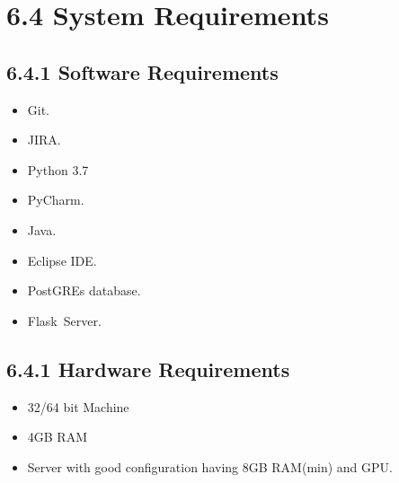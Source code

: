 \documentclass[oneside,a4paper,12pt]{book}
\begin{document}
\section*{6.4 System Requirements}
\subsection*{6.4.1 Software Requirements}
\setlength{\parskip}{0.0pt}
\begin{itemize}
	\item Git.\par

	\item JIRA.\par

	\item Python 3.7\par

	\item PyCharm.\par

	\item Java.\par

	\item Eclipse IDE.\par

	\item PostGREs database.\par

\setlength{\parskip}{9.96pt}
	\item Flask\  Server.
\end{itemize}\par

\subsection*{6.4.1 Hardware Requirements}
\setlength{\parskip}{0.0pt}
\begin{itemize}
	\item 32/64 bit Machine\par

	\item 4GB RAM\par

\setlength{\parskip}{9.96pt}
	\item Server with good configuration having 8GB RAM(min) and GPU.
\end{itemize}\par
\end{document}
